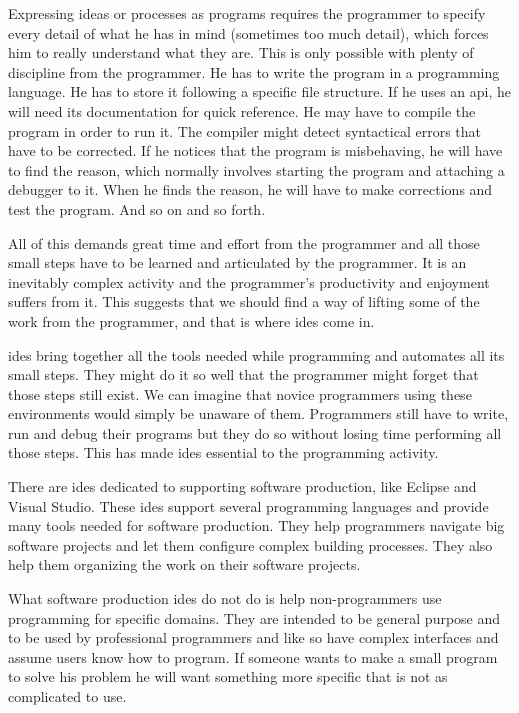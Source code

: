 \documentclass{./llncs2e/llncs}
\begin{document}
	Expressing ideas or processes as programs requires the programmer to specify every detail of what he has in mind (sometimes too much detail), which forces him to really understand what they are.
	This is only possible with plenty of discipline from the programmer.
	He has to write the program in a programming language.
	He has to store it following a specific file structure.
	If he uses an \ac{api}, he will need its documentation for quick reference.
	He may have to compile the program in order to run it.
	The compiler might detect syntactical errors that have to be corrected.
	If he notices that the program is misbehaving, he will have to find the reason, which normally involves starting the program and attaching a debugger to it.
	When he finds the reason, he will have to make corrections and test the program.
	And so on and so forth.

	All of this demands great time and effort from the programmer and all those small steps have to be learned and articulated by the programmer.
	It is an inevitably complex activity and the programmer's productivity and enjoyment suffers from it.
	This suggests that we should find a way of lifting some of the work from the programmer, and that is where \acp{ide} come in.

	\acp{ide} bring together all the tools needed while programming and automates all its small steps.
	They might do it so well that the programmer might forget that those steps still exist.
	We can imagine that novice programmers using these environments would simply be unaware of them.
	Programmers still have to write, run and debug their programs but they do so without losing time performing all those steps.
	This has made \acp{ide} essential to the programming activity.
	
	There are \ac{ide}s dedicated to supporting software production, like Eclipse\cite{eclipse2007eclipse} and Visual Studio\cite{mvs2002mvs}.
	These \ac{ide}s support several programming languages and provide many tools needed for software production.
	They help programmers navigate big software projects and let them configure complex building processes.
	They also help them organizing the work on their software projects.
	
	What software production \acp{ide} do not do is help non-programmers use programming for specific domains.
	They are intended to be general purpose and to be used by professional programmers and like so have complex interfaces and assume users know how to program.
	If someone wants to make a small program to solve his problem he will want something more specific that is not as complicated to use.
	
\end{document}
